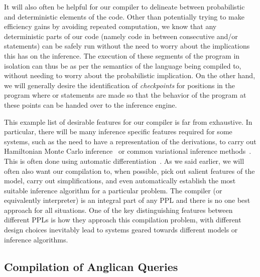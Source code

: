 It will also often be helpful for our compiler to delineate between probabilistic and deterministic
elements of the code.  Other than potentially trying to make efficiency gains by avoiding
repeated computation, we know that any deterministic parts of our code (namely code in between
consecutive \sample and/or \observe statements) can be safely run without the need
to worry about the implications this has on the inference.  The execution of these segments of
the program in isolation can thus be as per the semantics of the language being compiled to, without needing to
worry about the probabilistic implication.  On the other hand, we will generally desire the identification
of \emph{checkpoints} for positions in the program where \sample or \observe statements are
made so that the behavior of the program at these points can be handed over to the inference
engine.
%

This example list of desirable features for our compiler is far from exhaustive.
In particular, there will be many inference specific features required for some
systems, such as the need to have a representation of the derivations, to carry out 
Hamiltonian Monte Carlo inference~\cite{carpenter2015stan}
or common variational inference methods~\citep{kucukelbir2015automatic}.  
This is often done using automatic differentiation~\cite{baydin2015automatic}.
As we
said earlier, we will often also want our compilation to, when possible,
pick out salient features of the model, carry out simplifications, and even automatically 
establish the most suitable inference algorithm for a particular problem.  The compiler (or equivalently interpreter)
is an integral part of any PPL and there is no one best approach for all situations. 
One of the key distinguishing features between different PPLs is how they approach
this compilation problem, with different design choices inevitably lead to systems
geared towards different models or inference algorithms. 

\subsection{Compilation of Anglican Queries}
\label{sec:proginf:comp:ang}

